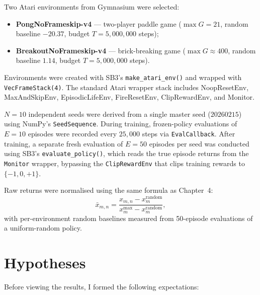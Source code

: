 Two Atari environments from Gymnasium were selected:
\begin{itemize}
  \item \textbf{PongNoFrameskip-v4} --- two-player paddle game
        ($\max G = 21$, random baseline $-20.37$,
        budget $T = 5{,}000{,}000$ steps);
  \item \textbf{BreakoutNoFrameskip-v4} --- brick-breaking game
        ($\max G \approx 400$, random baseline $1.14$,
        budget $T = 5{,}000{,}000$ steps).
\end{itemize}
Environments were created with SB3's \texttt{make\_atari\_env()} and
wrapped with \texttt{VecFrameStack(4)}. The standard Atari wrapper
stack includes NoopResetEnv, MaxAndSkipEnv, EpisodicLifeEnv,
FireResetEnv, ClipRewardEnv, and Monitor.

$N = 10$ independent seeds were derived from a single master seed
($20260215$) using NumPy's \texttt{SeedSequence}. During training,
frozen-policy evaluations of $E = 10$ episodes were recorded every
$25{,}000$ steps via \texttt{EvalCallback}. After training, a separate
fresh evaluation of $E = 50$ episodes per seed was conducted using
SB3's \texttt{evaluate\_policy()}, which reads the true episode returns
from the \texttt{Monitor} wrapper, bypassing the
\texttt{ClipRewardEnv} that clips training rewards to $\{-1, 0, +1\}$.

Raw returns were normalised using the same formula as Chapter~4:
\[
  \bar{x}_{m,n} = \frac{x_{m,n} - x^{\text{random}}_m}
                       {x^{\max}_m - x^{\text{random}}_m},
\]
with per-environment random baselines measured from 50-episode
evaluations of a uniform-random policy.

\section{Hypotheses}
\label{sec:atari-hypotheses}

Before viewing the results, I formed the following expectations:

